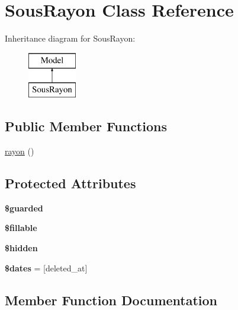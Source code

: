 \hypertarget{class_app_1_1_sous_rayon}{}\section{Sous\+Rayon Class Reference}
\label{class_app_1_1_sous_rayon}
Inheritance diagram for Sous\+Rayon\+:\begin{figure}[H]
\begin{center}
\leavevmode
\includegraphics[height=2.000000cm]{class_app_1_1_sous_rayon}
\end{center}
\end{figure}
\subsection*{Public Member Functions}
\begin{DoxyCompactItemize}
\item 
\mbox{\hyperlink{class_app_1_1_sous_rayon_a22ecc7df4363c9642919f5ec80339ded}{rayon}} ()
\end{DoxyCompactItemize}
\subsection*{Protected Attributes}
\begin{DoxyCompactItemize}
\item 
{\bfseries \$guarded}
\item 
{\bfseries \$fillable}
\item 
{\bfseries \$hidden}
\item 
\mbox{\label{class_app_1_1_sous_rayon_aab581066837d6296ba35c72937b6fc1c}} 
{\bfseries \$dates} = \mbox{[}\textquotesingle{}deleted\+\_\+at\textquotesingle{}\mbox{]}
\end{DoxyCompactItemize}


\subsection{Member Function Documentation}
\mbox{\label{class_app_1_1_sous_rayon_a22ecc7df4363c9642919f5ec80339ded}} 
